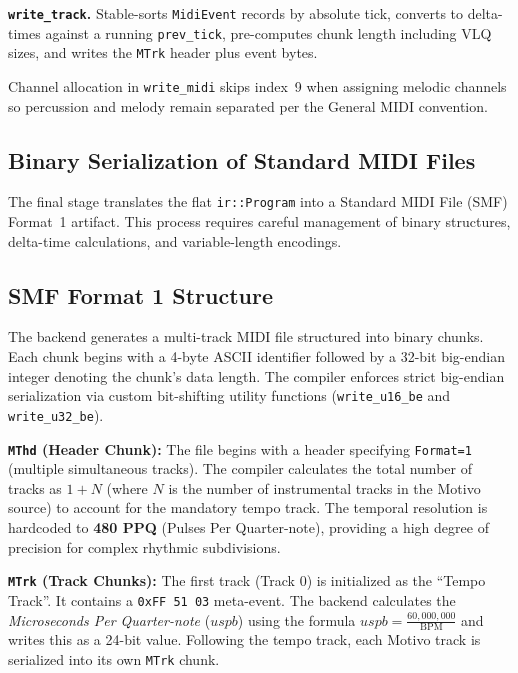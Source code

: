 \noindent \textbf{\texttt{write\_track}.} Stable-sorts \texttt{MidiEvent} records by absolute tick, converts to
delta-times against a running \texttt{prev\_tick}, pre-computes chunk length including VLQ sizes, and writes the
\texttt{MTrk} header plus event bytes.

Channel allocation in \texttt{write\_midi} skips index~9 when assigning melodic channels so percussion and melody remain
separated per the General MIDI convention.

\subsection{Binary Serialization of Standard MIDI Files}\label{subsec:midi-binary-serialization}

The final stage translates the flat \texttt{ir::Program} into a Standard MIDI File (SMF) Format~1 artifact.
This process requires careful management of binary structures, delta-time calculations, and variable-length encodings.

\subsection{SMF Format 1 Structure}\label{detail-subsec:smf-format-1-structure}

The backend generates a multi-track MIDI file structured into binary chunks.
Each chunk begins with a 4-byte ASCII identifier followed by a 32-bit big-endian integer denoting the chunk's data
length.
The compiler enforces strict big-endian serialization via custom bit-shifting utility functions (\texttt{write\_u16\_be}
and \texttt{write\_u32\_be}).

\noindent \textbf{\texttt{MThd} (Header Chunk):} The file begins with a header specifying \texttt{Format=1}
(multiple simultaneous tracks).
The compiler calculates the total number of tracks as $1 + N$ (where $N$ is the number of instrumental tracks in the
Motivo source) to account for the mandatory tempo track.
The temporal resolution is hardcoded to \textbf{480 PPQ} (Pulses Per Quarter-note), providing a high degree of
precision for complex rhythmic subdivisions.

\noindent \textbf{\texttt{MTrk} (Track Chunks):} The first track (Track 0) is initialized as the ``Tempo Track''.
It contains a \texttt{0xFF 51 03} meta-event.
The backend calculates the \textit{Microseconds Per Quarter-note} ($uspb$) using the formula $uspb =
\frac{60,000,000}{\mathrm{BPM}}$ and writes this as a 24-bit value.
Following the tempo track, each Motivo track is serialized into its own \texttt{MTrk} chunk.

